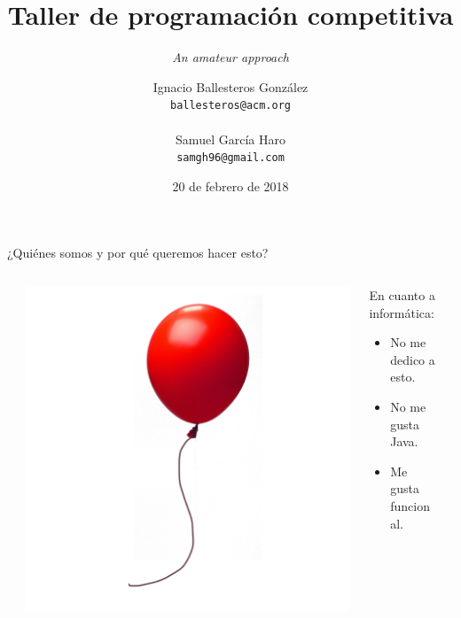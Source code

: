 \documentclass[10pt,handout]{beamer}
\title{Taller de programación competitiva}
\subtitle{\textit{An amateur approach}}
\date{20 de febrero de 2018}
\author{
  Ignacio Ballesteros González\\
  {\color{mygray}\texttt{ballesteros@acm.org}\\}
  \\
  Samuel García Haro\\
  {\color{mygray}\texttt{samgh96@gmail.com}\\}
}
\institute{}
\begin{document}
\maketitle

\begin{frame}{¿Quiénes somos y por qué queremos hacer esto?}
  \begin{columns}[onlytextwidth]
    \begin{column}{0.35\textwidth}
      \centering
      \rule{100pt}{150pt}%
    \end{column}
    \begin{column}{0.3\textwidth}
      \centering
      \includegraphics[width=\textwidth]{globo.png}
    \end{column}
    \begin{column}{0.35\textwidth}
      En cuanto a informática:
      \begin{itemize}
        \item No me dedico a esto.
        \item No me gusta Java.
        \item Me gusta funcional.
      \end{itemize}
    \end{column}
​  \end{columns}
\end{frame}
\end{document}
